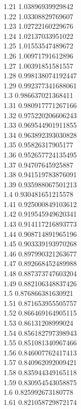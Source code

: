 {1.21	1.03896939929842\\
1.22	1.03308829769607\\
1.23	1.02722160229676\\
1.24	1.02137033951022\\
1.25	1.01553547489672\\
1.26	1.00971791612896\\
1.27	1.00391851581557\\
1.28	0.998138074192447\\
1.29	0.992377341688061\\
1.3	0.986637021368411\\
1.31	0.980917771267166\\
1.32	0.975220206606243\\
1.33	0.969544901911855\\
1.34	0.963892393030828\\
1.35	0.95826317905177\\
1.36	0.952657724135495\\
1.37	0.94707645925887\\
1.38	0.941519783876091\\
1.39	0.935988067501213\\
1.4	0.930481651215578\\
1.41	0.925000849103612\\
1.42	0.919545949620341\\
1.43	0.914117216893773\\
1.44	0.908714891965196\\
1.45	0.903339193970268\\
1.46	0.897990321263677\\
1.47	0.892668452489988\\
1.48	0.887373747603204\\
1.49	0.882106348837426\\
1.5	0.876866381630921\\
1.51	0.871653955505757\\
1.52	0.866469164905115\\
1.53	0.86131208999024\\
1.54	0.856182797398943\\
1.55	0.851081340967466\\
1.56	0.846007762417413\\
1.57	0.840962092009421\\
1.58	0.835944349165118\\
1.59	0.830954543058875\\
1.6	0.825992673180778\\
1.61	0.821058729872174\\
}
